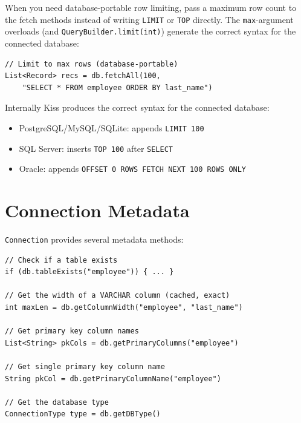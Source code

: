 When you need database-portable row limiting, pass a maximum row count to the fetch methods instead of writing \texttt{LIMIT} or \texttt{TOP} directly.  The \texttt{max}-argument overloads (and \texttt{QueryBuilder.limit(int)}) generate the correct syntax for the connected database:

\begin{lstlisting}[style=groovy]
// Limit to max rows (database-portable)
List<Record> recs = db.fetchAll(100,
    "SELECT * FROM employee ORDER BY last_name")
\end{lstlisting}

\noindent
Internally Kiss produces the correct syntax for the connected database:
\begin{itemize}
  \item PostgreSQL/MySQL/SQLite: appends \texttt{LIMIT 100}
  \item SQL Server: inserts \texttt{TOP 100} after \texttt{SELECT}
  \item Oracle: appends \texttt{OFFSET 0 ROWS FETCH NEXT 100 ROWS ONLY}
\end{itemize}

\section{Connection Metadata}
\label{sec:db-metadata}

\texttt{Connection} provides several metadata methods:

\begin{lstlisting}[style=groovy]
// Check if a table exists
if (db.tableExists("employee")) { ... }

// Get the width of a VARCHAR column (cached, exact)
int maxLen = db.getColumnWidth("employee", "last_name")

// Get primary key column names
List<String> pkCols = db.getPrimaryColumns("employee")

// Get single primary key column name
String pkCol = db.getPrimaryColumnName("employee")

// Get the database type
ConnectionType type = db.getDBType()
\end{lstlisting}

